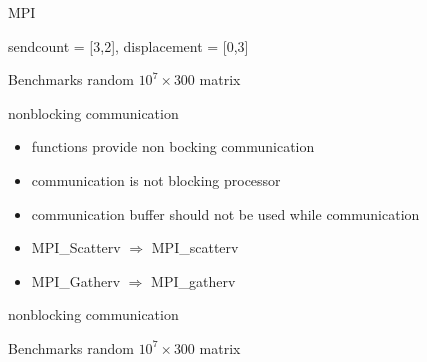 \begin{frame}{MPI}
	\Large{}
	\normalsize
	
	\vspace{1cm}
	\centering	
	
	\vspace{1cm}
	sendcount = [3,2], displacement = [0,3]
\end{frame}

\begin{frame}{Benchmarks}
	\Large{}
	\normalsize  random $10^7 \times 300 $ matrix
	
	\centering
	\scalebox{0.75}{
		
	}	
\end{frame}

\begin{frame}{nonblocking communication}
	\Large{  }
	
	\begin{itemize}
		\item {} functions provide non bocking communication
		\item communication is not blocking processor
		\item communication buffer should not be used while communication	
		\item MPI\_Scatterv $\Rightarrow$ MPI\_scatterv  
		\item MPI\_Gatherv $\Rightarrow$ MPI\_gatherv

	\end{itemize}	
\end{frame}

\begin{frame}{nonblocking communication}
	\Large{}
	\normalsize
	
	\centering
	\scalebox{0.75}{
		
	}	
\end{frame}

\begin{frame}{Benchmarks}
	\Large{}
	\normalsize  random $10^7 \times 300 $ matrix
	
	\centering
	\scalebox{0.75}{
		
	}	
\end{frame}

